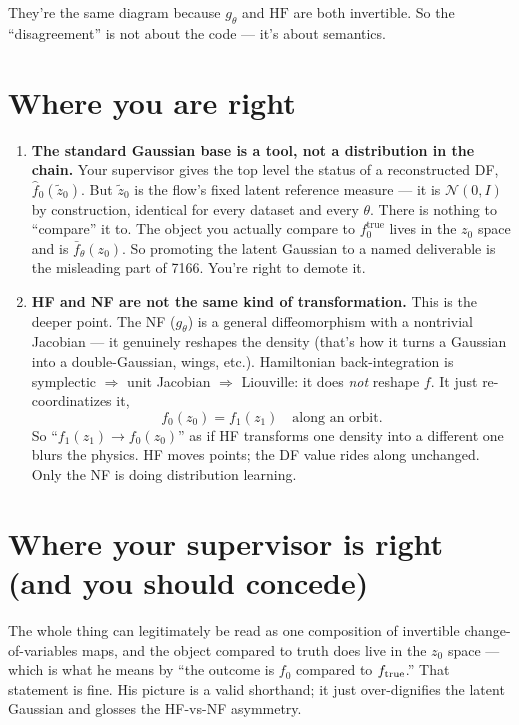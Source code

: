 \documentclass[11pt]{article}
\newcommand{\Ntrue}{f_0^{\text{true}}}
\newcommand{\HF}{\mathrm{HF}}
\begin{document}
They're the same diagram because $g_\theta$ and $\HF$ are both invertible. So the
``disagreement'' is not about the code --- it's about semantics.

\section*{Where you are right}

\begin{enumerate}
  \item \textbf{The standard Gaussian base is a tool, not a distribution in the chain.}
  Your supervisor gives the top level the status of a reconstructed DF,
  $\hat f_0(\tilde z_0)$. But $\tilde z_0$ is the flow's fixed latent reference
  measure --- it is $\mathcal N(0,I)$ by construction, identical for every dataset and
  every $\theta$. There is nothing to ``compare'' it to. The object you actually compare
  to $\Ntrue$ lives in the $z_0$ space and is $\bar f_\theta(z_0)$. So promoting the
  latent Gaussian to a named deliverable is the misleading part of 7166. You're right to
  demote it.

  \item \textbf{HF and NF are not the same kind of transformation.} This is the deeper
  point. The NF ($g_\theta$) is a general diffeomorphism with a nontrivial Jacobian ---
  it genuinely reshapes the density (that's how it turns a Gaussian into a
  double-Gaussian, wings, etc.). Hamiltonian back-integration is symplectic
  $\Rightarrow$ unit Jacobian $\Rightarrow$ Liouville: it does \emph{not} reshape $f$.
  It just re-coordinatizes it,
  \[
    f_0(z_0) = f_1(z_1) \quad \text{along an orbit.}
  \]
  So ``$f_1(z_1)\to f_0(z_0)$'' as if HF transforms one density into a different one
  blurs the physics. HF moves points; the DF value rides along unchanged. Only the NF is
  doing distribution learning.
\end{enumerate}

\section*{Where your supervisor is right (and you should concede)}

The whole thing can legitimately be read as one composition of invertible
change-of-variables maps, and the object compared to truth does live in the $z_0$
space --- which is what he means by ``the outcome is $f_0$ compared to
$f_{\rm true}$.'' That statement is fine. His picture is a valid shorthand; it just
over-dignifies the latent Gaussian and glosses the HF-vs-NF asymmetry.
\end{document}
